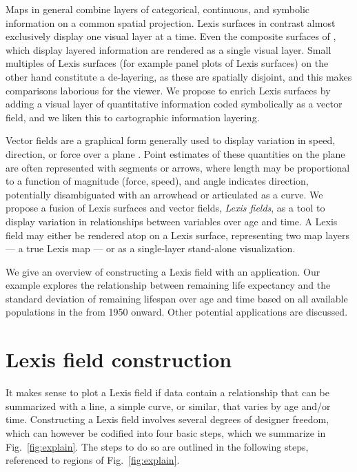 \documentclass{article}
\begin{document}
Maps in general combine layers of categorical, continuous, and
symbolic information on a common spatial projection. Lexis surfaces in contrast almost exclusively display one visual layer at a time. Even the composite surfaces of \citet{scholey2017visualizing}, which display layered information are rendered as a single visual layer. Small multiples of Lexis surfaces (for example panel plots of Lexis surfaces) on the other hand constitute a de-layering, as these are spatially disjoint, and this makes comparisons laborious for the viewer. We propose to enrich Lexis surfaces by adding a visual layer of quantitative information coded symbolically as a vector field, and we liken this to cartographic information layering.

Vector fields are a graphical form generally used to display variation in speed,
direction, or force over a plane \citep{weiskopf2007vector}. Point estimates of these quantities on the plane are
often represented with segments or arrows, where length may be proportional to a function of
magnitude (force, speed), and angle indicates direction, potentially disambiguated with an arrowhead or articulated as a curve. We propose a fusion of Lexis surfaces and vector fields, \emph{Lexis fields}, as a tool to
display variation in relationships between variables over age and time. A Lexis field may either be rendered atop on a Lexis surface, representing two map layers --- a true Lexis map --- or as a single-layer stand-alone visualization. 

We give an overview of constructing a Lexis field with an application. Our example explores the relationship between remaining life expectancy and
the standard deviation of remaining lifespan over age and time based on all
available populations in the \citet{HMD} from 1950 onward. Other potential applications are discussed.

\section{Lexis field construction}

It makes sense to plot a Lexis field if data contain a relationship that can be summarized with a line, a simple curve, or similar, that varies by age and/or time. Constructing a Lexis field involves several degrees of designer freedom, which can however be codified into four basic steps, which we summarize in Fig.~\ref{fig:explain}. The steps to do so are outlined in the following steps, referenced to regions of Fig.~\ref{fig:explain}.
\end{document}
